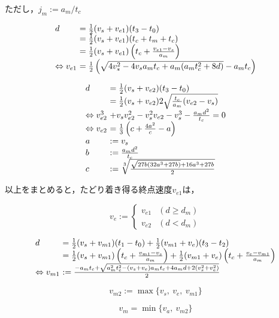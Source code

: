 \documentclass[a5paper]{ltjsarticle}
\begin{document}
ただし，$j_m:=a_m/t_c$

$$
    \begin{array}{l@{~}l}
        d                      & = \frac{1}{2}(v_s+v_{e1})(t_3-t_0)
        \\
                               & = \frac{1}{2}(v_s+v_{e1})(t_c+t_m+t_c)
        \\
                               & = \frac{1}{2}(v_s+v_{e1})\left(t_c+\frac{v_{e1}-v_s}{a_m}\right)
        \\
        \Leftrightarrow v_{e1} & =
        \frac{1}{2}\left(\sqrt{4v_s^2-4v_sa_mt_c+a_m(a_mt_c^2+8d)}-a_mt_c\right)
    \end{array}
$$

$$
    \begin{array}{l@{~}l}
        d        & =                                                         \frac{1}{2}(v_s+v_{e2})(t_3-t_0)
        \\
                 & =                                                         \frac{1}{2}(v_s+v_{e2})2\sqrt{\frac{t_c}{a_m}(v_{e2}-v_s)}
        \\
        \Leftrightarrow
        v_{e2}^3 & + v_s v_{e2}^2-v_s^2v_{e2}-v_s^3-\frac{a_md^2}{t_c} = 0
        \\
        \Leftrightarrow
        v_{e2}   & =
        \frac{1}{3}\left(c +\frac{4a^2}{c}
        -a
        \right)
        \\
        a        & := v_s
        \\
        b        & :=                                                        \frac{a_md^2}{t_c}
        \\
        c        & :=                                                        \sqrt[3]{\frac{\sqrt{27b(32a^3+27b)} + 16a^3+27b}{2}}
    \end{array}
$$

以上をまとめると，たどり着き得る終点速度$v_{e1}$は，

$$
    v_{e} :=
    \left\{\begin{array}{ll}
        v_{e1} & (d        \ge d_m) \\
        v_{e2} & (d < d_m)
    \end{array}\right.
$$

$$
    \begin{array}{l@{~}l}
        d                      & =
        \frac{1}{2}(v_s+v_{m1})(t_1-t_0)+
        \frac{1}{2}(v_{m1}+v_e)(t_3-t_2)
        \\
                               & =
        \frac{1}{2}(v_s+v_{m1})\left(t_c+\frac{v_{m1}-v_s}{a_m}\right)+
        \frac{1}{2}(v_{m1}+v_e)\left(t_c+\frac{v_e-v_{m1}}{a_m}\right)
        \\
        \Leftrightarrow v_{m1} & := \frac{-a_mt_c + \sqrt{a_m^2t_c^2-(v_s+v_e)a_mt_c+4a_md+2(v_s^2+v_e^2)}}{2}
    \end{array}
$$

$$
    v_{m2} := \max\{v_s,~v_e,~v_{m1}\}
$$

$$
    v_m = \min\{v_a,~v_{m2}\}
$$
\end{document}
